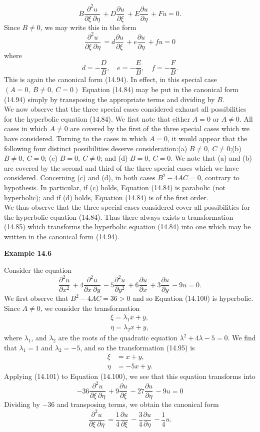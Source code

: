 \documentclass[11pt,a4paper, twoside]{report}
\newcommand{\pf}[2]{\dfrac{\partial #1}{\partial #2}\,}
\newcommand{\pfn}[3]{\dfrac{\partial^#3 #1}{\partial #2^#3}\,}
\newcommand{\pfp}[4]{\dfrac{\partial^#4 #1}{\partial #2\ \partial #3}\,}
\begin{document}
	$$
	B\pfp{u}{\xi}{\eta}{2} + D\pf{u}{\xi} + E\pf{u}{\eta} + Fu = 0.
	$$
	Since $B \neq 0$, we may write this in the form
	$$
	\pfp{u}{\xi}{\eta}{2} = d\pf{u}{\xi} + e\pf{u}{\eta} + fu = 0
	$$
	where
	$$
	d = -\frac{D}{B},\quad e = -\frac{E}{B},\quad f = -\frac{F}{B}.
	$$
	This is again the canonical form (14.94). In effect, in this special case $(A = 0,\ B\neq 0,\ C = 0)$ Equation (14.84) may be put in the canonical form (14.94) simply by transposing the appropriate terms and dividing by $B$.\\
	We now observe that the three special cases considered exhaust all possibilities for the hyperbolic equation (14.84). We first note that either $A = 0$ or $A \neq 0$. All cases in which  $A \neq 0$ are covered  by  the first  of  the three special cases  which  we have considered. Turning to the cases in which $A = 0$, it would appear that the following four distinct possibilities deserve consideration:(a) $B \neq 0,\ C \neq 0$;(b) $B \neq 0,\ C = 0$; (c) $B = 0,\ C \neq 0$; and (d) $B = 0,\ C = 0$. We note that (a) and (b) are covered by the second and third of the three special cases which we have considered. Concerning (c) and (d), in both cases $B^2 - 4AC = 0$, contrary  to hypothesis. In particular, if (c) holds, Equation (14.84) is parabolic (not hyperbolic); and if (d) holds, Equation (14.84) is of the first order.\\
	We thus observe that the three special cases considered cover all possibilities for the hyperbolic equation (14.84). Thus there always exists a transformation (14.85) which transforms the hyperbolic equation (14.84) into one which may be written in the canonical form (14.94).\par
	\textbf{Example 14.6}\par
	Consider the equation
	\begin{equation}\tag{14.100}
		\pfn{u}{x}{2} + 4\pfp{u}{x}{y}{2} - 5\pfn{u}{y}{2} + 6\pf{u}{x} + 3\pf{u}{y} - 9u = 0.
	\end{equation}
	We first observe that $B^2 - 4AC = 36 > 0$ and so Equation (14.100) is hyperbolic. Since $A \neq 0$, we consider the transformation
	\begin{equation}\tag{14.95}
		\begin{aligned}
			\xi = \lambda_1 x + y,\\
			\eta = \lambda_2 x + y,
		\end{aligned}
	\end{equation}
	where $\lambda_1$, and $\lambda_2$ are the roots of the quadratic equation $\lambda^2 + 4\lambda - 5 = 0$. We find that $\lambda_1 = 1$ and $\lambda_2 = -5$, and so the transformation (14.95) is
	\begin{equation}\tag{14.101}
		\begin{aligned}
			\xi &= x+y,\\
			\eta &= -5x + y.
		\end{aligned}
	\end{equation}
	Applying (14.101) to Equation (14.100), we see that this equation transforms into
	$$
	-36\pfp{u}{\xi}{\eta}{2} + 9\pf{u}{\xi} - 27\pf{u}{\eta} - 9u = 0
	$$
	Dividing by $-36$ and transposing terms, we obtain the canonical form
	$$
	\pfp{u}{\xi}{\eta}{2} = \frac{1}{4}\pf{u}{\xi} - \frac{3}{4}\pf{u}{\eta} - \frac{1}{4}u.
	$$
\end{document}
